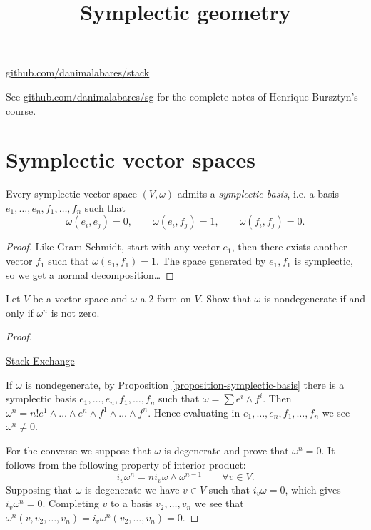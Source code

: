 



\title{Symplectic geometry}
\maketitle

\label{section-phantom}
\hfill
\href{http://github.com/danimalabares/stack}{github.com/danimalabares/stack}

\tableofcontents

\noindent
See \href{http://github.com/danimalabares/sg}{github.com/danimalabares/sg}
for the complete notes of Henrique Bursztyn's course.

\section{Symplectic vector spaces}
\label{section-symplectic-vector-spaces}

\begin{proposition}
\label{proposition-symplectic-basis}
Every symplectic vector space $(V,\omega)$
admits a {\it symplectic basis},
i.e. a basis $e_1,…,e_n,f_1,…,f_n$
such that
$$
\omega(e_i,e_j)=0,\qquad \omega(e_i,f_j)=1,\qquad \omega(f_i,f_j)=0.
$$
\end{proposition}

\begin{proof}
Like Gram-Schmidt, start with any vector $e_1$,
then there exists another vector $f_1$
such that $\omega(e_1,f_1)=1$.
The space generated by $e_1,f_1$
is symplectic, so we get a normal decomposition…
\end{proof}

\begin{exercise}
\label{exercise-omega-power-n}
Let $V$ be a vector space and $\omega$ a 2-form on $V$.
Show that $\omega$ is nondegenerate if and only if
$\omega^n$ is not zero.
\end{exercise}

\begin{proof}
\begin{reference}
\href{https://math.stackexchange.com/
questions/417365/
how-to-show-omegan-is-a-volume-form-in-a-symplectic-manifold-m-omega}
{Stack Exchange}
\end{reference}
If $\omega$ is nondegenerate,
by Proposition \ref{proposition-symplectic-basis}
there is a symplectic basis
$e_1,…,e_n,f_1,…,f_n$
such that $\omega=\sum e^i \wedge f^i$.
Then $\omega^n=n! e^1\wedge…\wedge e^n \wedge f^1\wedge… \wedge f^n$.
Hence evaluating in $e_1,…,e_n,f_1,…,f_n$
we see $\omega^n\neq 0$.

For the converse we suppose that $\omega$
is degenerate and prove that $\omega^n=0$.
It follows from the following property of interior product:
$$
i_v\omega^n=n i_v\omega \wedge \omega^{n-1}\qquad \forall  v \in V.
$$
Supposing that $\omega$ is degenerate we
have $v \in V$ such that $i_v\omega=0$,
which gives $i_v \omega^n=0$.
Completing $v$ to a basis $v_2,…,v_n$
we see that $\omega^n(v,v_2,…,v_n)=i_v\omega^n(v_2,…,v_n)=0$.
\end{proof}

